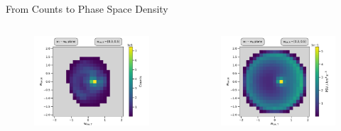 \documentclass{beamer}
\begin{document}
\begin{frame}{From Counts to Phase Space Density}
\begin{columns}
	\column[]{5.5cm}
	\begin{figure}
		\includegraphics[scale=.35]{Pics/cart_50_counts_R.pdf}
	\end{figure}
	\column[]{5cm}
	\begin{figure}
		\includegraphics[scale=.35]{Pics/cart_50_norm_R.pdf}
	\end{figure}
\column[]{1cm}
	\end{columns}

\end{frame}

\end{document}
